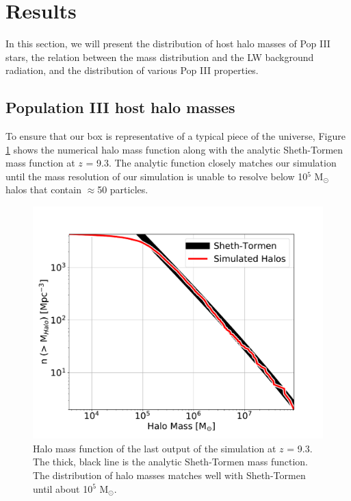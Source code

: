 \documentclass[a4paper,fleqn,usenatbib]{mnras}
\begin{document}
\section{Results}
In this section, we will present the distribution of host halo masses of Pop III stars, the relation between the mass distribution and the LW background radiation, and the distribution of various Pop III properties.

\subsection{Population III host halo masses}
To ensure that our box is representative of a typical piece of the universe, Figure \ref{fig:hmf} shows the numerical halo mass function along with the analytic Sheth-Tormen mass function at $z$ = 9.3. The analytic function closely matches our simulation until the mass resolution of our simulation is unable to resolve below 10$^{5}$ M$_{\odot}$ halos that contain $\approx$50 particles. 

\begin{figure}
	\includegraphics[width=\columnwidth]{images/hmf.pdf}
    \caption{Halo mass function of the last output of the simulation at $z$ = 9.3. The thick, black line is the analytic Sheth-Tormen mass function. The distribution of halo masses matches well with Sheth-Tormen until about 10$^{5}$ M$_{\odot}$.}
    \label{fig:hmf}
\end{figure}
\end{document}
